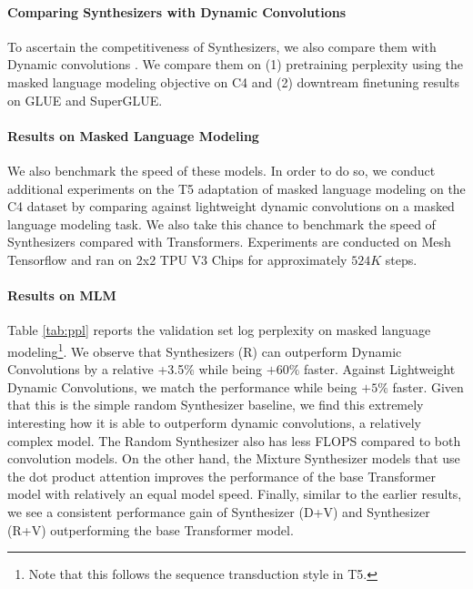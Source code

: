 \paragraph{Comparing Synthesizers with Dynamic Convolutions} To ascertain the competitiveness of Synthesizers, we also compare them with Dynamic convolutions \citep{wu2019pay}. We compare them on (1) pretraining perplexity using the masked language modeling objective on C4 and (2) downtream finetuning results on GLUE and SuperGLUE.

\paragraph{Results on Masked Language Modeling} We also benchmark the speed of these models. In order to do so, we conduct additional experiments on the T5 adaptation of masked language modeling on the C4 dataset \citep{raffel2019exploring} by comparing against lightweight dynamic convolutions \citep{wu2019pay} on a masked language modeling task. We also take this chance to benchmark the speed of Synthesizers compared with Transformers. Experiments are conducted on Mesh Tensorflow \citep{shazeer2018mesh} and ran on 2x2 TPU V3 Chips for approximately $524K$ steps.

\paragraph{Results on MLM} Table \ref{tab:ppl} reports the validation set log perplexity on masked language modeling\footnote{Note that this follows the sequence transduction style in T5.}. We observe that Synthesizers (R) can outperform Dynamic Convolutions by a relative +3.5\% while being $+60\%$ faster. Against Lightweight Dynamic Convolutions, we match the performance while being $+5\%$ faster. Given that this is the simple random Synthesizer baseline, we find this extremely interesting how it is able to outperform dynamic convolutions, a relatively complex model. The Random Synthesizer also has less FLOPS compared to both convolution models. On the other hand, the Mixture Synthesizer models that use the dot product attention improves the performance of the base Transformer model with relatively an equal model speed. Finally, similar to the earlier results, we see a consistent performance gain of Synthesizer (D+V) and Synthesizer (R+V) outperforming the base Transformer model.

